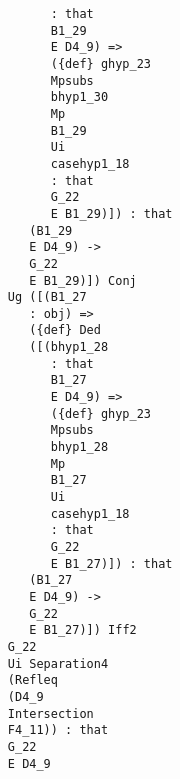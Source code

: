 \documentclass[12pt]{article}
\begin{document}
\begin{verbatim}
                                                 : that 
                                                 B1_29 
                                                 E D4_9) => 
                                                 ({def} ghyp_23 
                                                 Mpsubs 
                                                 bhyp1_30 
                                                 Mp 
                                                 B1_29 
                                                 Ui 
                                                 casehyp1_18 
                                                 : that 
                                                 G_22 
                                                 E B1_29)]) : that 
                                              (B1_29 
                                              E D4_9) -> 
                                              G_22 
                                              E B1_29)]) Conj 
                                           Ug ([(B1_27 
                                              : obj) => 
                                              ({def} Ded 
                                              ([(bhyp1_28 
                                                 : that 
                                                 B1_27 
                                                 E D4_9) => 
                                                 ({def} ghyp_23 
                                                 Mpsubs 
                                                 bhyp1_28 
                                                 Mp 
                                                 B1_27 
                                                 Ui 
                                                 casehyp1_18 
                                                 : that 
                                                 G_22 
                                                 E B1_27)]) : that 
                                              (B1_27 
                                              E D4_9) -> 
                                              G_22 
                                              E B1_27)]) Iff2 
                                           G_22 
                                           Ui Separation4 
                                           (Refleq 
                                           (D4_9 
                                           Intersection 
                                           F4_11)) : that 
                                           G_22 
                                           E D4_9 

\end{verbatim}
\end{document}
